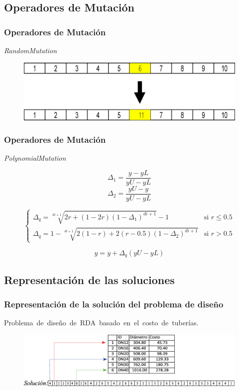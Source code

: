 \documentclass[9pt]{beamer}
\begin{document}
    \subsection{Operadores de Mutación}

    \begin{frame}
        \frametitle{Operadores de Mutación}
        \textit{RandomMutation}
        \begin{figure}
            \includegraphics[width=\textwidth]{assets/Anexo/Mutation.eps}
        \end{figure}
      
    \end{frame}

    \begin{frame}
        \frametitle{Operadores de Mutación}
        \textit{PolynomialMutation}

        $$\Delta_1 = \frac{y-yL}{yU-yL}$$
        $$\Delta_2 = \frac{yU-y}{yU-yL}$$

        $$
        \begin{cases} 
        \Delta_q = \sqrt[di+1]{2r+(1-2r)(1-\Delta_{1})^{di+1}} - 1 & \text{si $r\leq 0.5$} \\ 
        \Delta_q = 1 - \sqrt[di+1]{2(1-r)+2(r-0.5)(1-\Delta_{2})^{di+1}} &  \text{si $r > 0.5$}
        \end{cases}
        $$

        $$y = y + \Delta_q(yU-yL)$$
    \end{frame}


    \subsection{Representación de las soluciones}
    \begin{frame}
        \frametitle{Representación de la solución del problema de diseño}
        Problema de diseño de RDA basado en el costo de tuberías.

        \begin{figure}
            \includegraphics[width=\textwidth]{assets/Anexo/representacion_solucion_monoobjetivo.eps}
        \end{figure}

    \end{frame}
\end{document}
